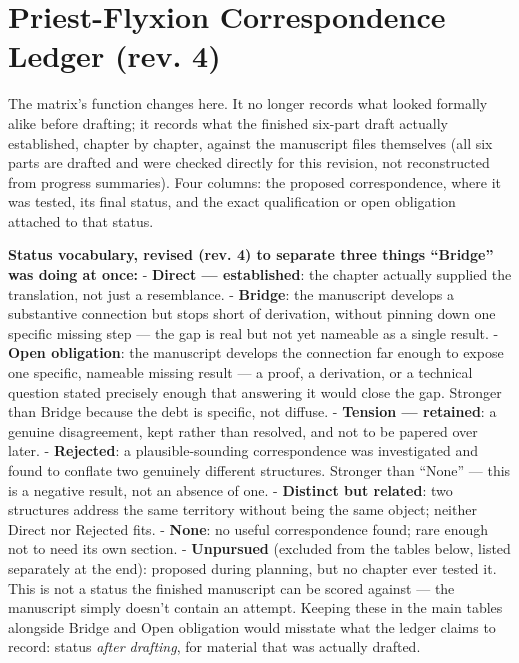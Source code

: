 \hypertarget{priest-flyxion-correspondence-ledger-rev.-4}{%
\chapter*{Priest-Flyxion Correspondence Ledger (rev. 4)}
\label{priest-flyxion-correspondence-ledger-rev.-4}}

The matrix's function changes here. It no longer records what looked
formally alike before drafting; it records what the finished six-part
draft actually established, chapter by chapter, against the manuscript
files themselves (all six parts are drafted and were checked directly for
this revision, not reconstructed from progress summaries). Four columns:
the proposed correspondence, where it was tested, its final status, and
the exact qualification or open obligation attached to that status.

\textbf{Status vocabulary, revised (rev. 4) to separate three things ``Bridge''
was doing at once:}
- \textbf{Direct --- established}: the chapter actually supplied the
translation, not just a resemblance.
- \textbf{Bridge}: the manuscript develops a substantive connection but
stops short of derivation, without pinning down one specific missing
step --- the gap is real but not yet nameable as a single result.
- \textbf{Open obligation}: the manuscript develops the connection far enough
to expose one specific, nameable missing result --- a proof, a
derivation, or a technical question stated precisely enough that
answering it would close the gap. Stronger than Bridge because the
debt is specific, not diffuse.
- \textbf{Tension --- retained}: a genuine disagreement, kept rather than
resolved, and not to be papered over later.
- \textbf{Rejected}: a plausible-sounding correspondence was investigated and
found to conflate two genuinely different structures. Stronger than
``None'' --- this is a negative result, not an absence of one.
- \textbf{Distinct but related}: two structures address the same territory
without being the same object; neither Direct nor Rejected fits.
- \textbf{None}: no useful correspondence found; rare enough not to need its
own section.
- \textbf{Unpursued} (excluded from the tables below, listed separately at
the end): proposed during planning, but no chapter ever tested it.
This is not a status the finished manuscript can be scored against ---
the manuscript simply doesn't contain an attempt. Keeping these in the
main tables alongside Bridge and Open obligation would misstate what
the ledger claims to record: status \emph{after drafting}, for material
that was actually drafted.

